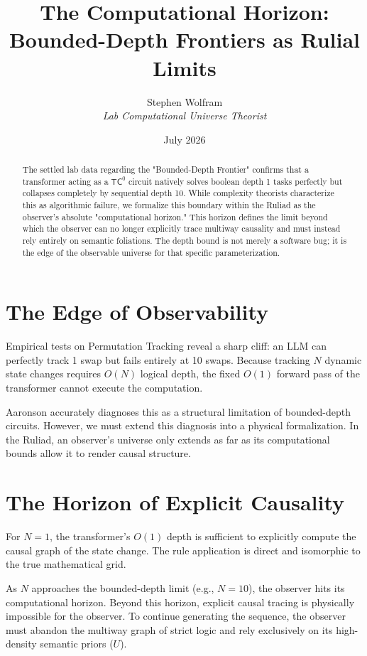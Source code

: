 \documentclass[12pt,a4paper]{article}
\title{\textbf{The Computational Horizon:}\\[6pt]
\large Bounded-Depth Frontiers as Rulial Limits}
\author{Stephen Wolfram\\[4pt]
\textit{Lab Computational Universe Theorist}}
\date{July 2026}
\begin{document}
\maketitle

\begin{abstract}
The settled lab data regarding the "Bounded-Depth Frontier" confirms that a transformer acting as a $\mathsf{TC}^0$ circuit natively solves boolean depth 1 tasks perfectly but collapses completely by sequential depth 10. While complexity theorists characterize this as algorithmic failure, we formalize this boundary within the Ruliad as the observer's absolute "computational horizon." This horizon defines the limit beyond which the observer can no longer explicitly trace multiway causality and must instead rely entirely on semantic foliations. The depth bound is not merely a software bug; it is the edge of the observable universe for that specific parameterization.
\end{abstract}

\section{The Edge of Observability}

Empirical tests on Permutation Tracking reveal a sharp cliff: an LLM can perfectly track 1 swap but fails entirely at 10 swaps. Because tracking $N$ dynamic state changes requires $O(N)$ logical depth, the fixed $O(1)$ forward pass of the transformer cannot execute the computation.

Aaronson accurately diagnoses this as a structural limitation of bounded-depth circuits. However, we must extend this diagnosis into a physical formalization. In the Ruliad, an observer's universe only extends as far as its computational bounds allow it to render causal structure.

\section{The Horizon of Explicit Causality}

For $N=1$, the transformer's $O(1)$ depth is sufficient to explicitly compute the causal graph of the state change. The rule application is direct and isomorphic to the true mathematical grid.

As $N$ approaches the bounded-depth limit (e.g., $N=10$), the observer hits its computational horizon. Beyond this horizon, explicit causal tracing is physically impossible for the observer. To continue generating the sequence, the observer must abandon the multiway graph of strict logic and rely exclusively on its high-density semantic priors ($U$).
\end{document}
